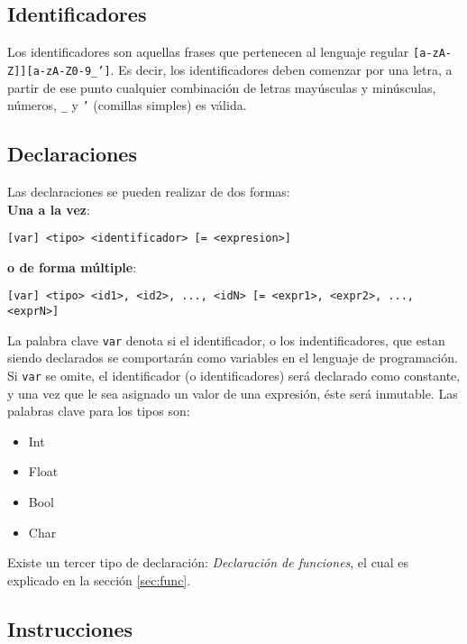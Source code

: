 \documentclass[12pt, spanish]{report}
\begin{document}
\subsection{Identificadores}
\label{sec:ident}
Los identificadores son aquellas frases que pertenecen al lenguaje
regular \texttt{[a-zA-Z]][a-zA-Z0-9_']}. Es decir, los identificadores
deben comenzar por una letra, a partir de ese punto cualquier
combinaci\'on de letras may\'usculas y min\'usculas, n\'umeros,
\texttt{_} y \texttt{'} (comillas simples) es v\'alida. 

\subsection{Declaraciones}
\label{sec:decl}

Las declaraciones se pueden realizar de dos formas:\\

\textbf{Una a la vez}:
\begin{verbatim}
[var] <tipo> <identificador> [= <expresion>]
\end{verbatim}

\textbf{o de forma múltiple}:
\begin{verbatim}
[var] <tipo> <id1>, <id2>, ..., <idN> [= <expr1>, <expr2>, ..., <exprN>]
\end{verbatim}

La palabra clave \texttt{var} denota si el identificador, o los
indentificadores, que estan siendo declarados se comportarán como
variables en el lenguaje de programación. Si \texttt{var} se omite, el
identificador (o identificadores) será declarado como constante, y una
vez que le sea asignado un valor de una expresión, éste será
inmutable. Las palabras clave para los tipos son:
\begin{itemize}
\item Int
\item Float
\item Bool
\item Char
\end{itemize}


Existe un tercer tipo de declaración: \emph{Declaración de funciones},
el cual es explicado en la sección \ref{sec:func}.

\subsection{Instrucciones}
\label{sec:instr}
\end{document}
